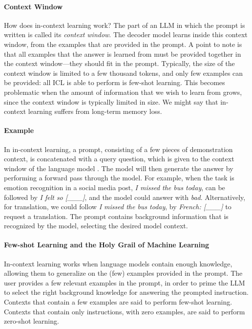 \paragraph{Context Window}
How does in-context learning work?
The part of an LLM in which the prompt is written is  called its {\em context window}.  The decoder model learns inside this context window, from the examples that are provided in the prompt. 
A point to note is that  all examples that the answer is learned from must be provided together in the context window---they should fit in the prompt. Typically, the size of the context window is limited to a few thousand tokens, and only few examples can be provided: all ICL is able to perform is  few-shot learning.
This becomes problematic when the amount of information that we wish to learn from grows, since the context window is typically limited in size.  We might say that in-context learning suffers from long-term memory loss.

\paragraph{Example}
In in-context learning, a prompt, consisting of a few pieces of
demonstration context, is concatenated with a query question, which is given
to the context window of the language model \citep{liu2023pre}. The model will then  generate the answer  by performing a forward pass through the model. For example,
when the task is emotion recognition in a social media post, {\em I
missed the bus today}, can be followed by {\em I felt so [\_\_\_]}, and the model could answer with {\em bad}.
%
Alternatively, for translation, we could follow {\em I missed the bus today}, by
{\em French: [\_\_\_]} to request a translation.
The prompt contains background information that is recognized by the
model, selecting the desired model context. 

\paragraph{Few-shot Learning and the Holy Grail of Machine Learning}
In-context learning works when language models contain enough 
knowledge, allowing them to generalize on the (few) examples provided in the prompt. The user provides a few relevant examples in the prompt, in order to prime the LLM to select the right background knowledge for answering the prompted instruction.
%
Contexts that contain a few examples
are said to perform few-shot learning. Contexts that contain
only instructions, with zero examples, are said to perform zero-shot learning. 

